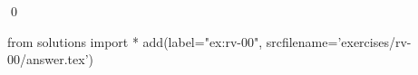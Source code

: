 
\begin{ex} 
  \label{ex:rv-00}
  
  \qed
\end{ex} 
\begin{python0}
from solutions import *
add(label="ex:rv-00",
    srcfilename='exercises/rv-00/answer.tex') 
\end{python0}
